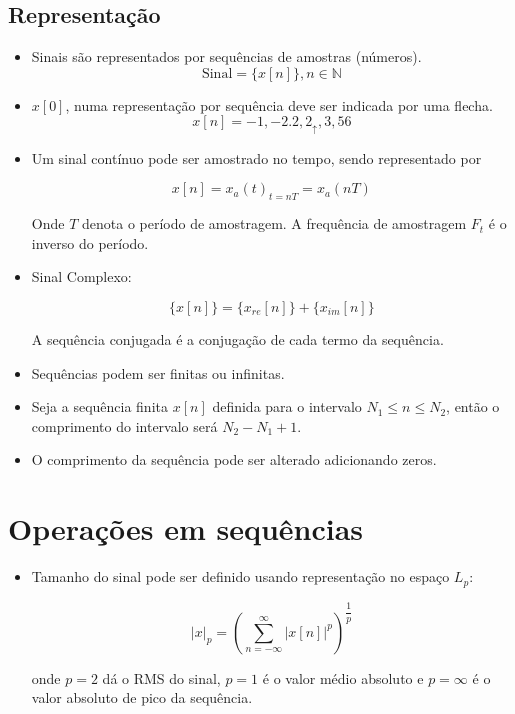 \subsection{Representação}
\begin{itemize}
    \item Sinais são representados por sequências de amostras (números).
    \[\text{Sinal} = \{x[n]\}, n \in \mathbb{N} \]

    \item $x[0]$, numa representação por sequência deve ser indicada por uma flecha.
    \[x[n] = -1, -2.2, 2_{\uparrow}, 3, 56 \]

    \item Um sinal contínuo pode ser amostrado no tempo, sendo representado por
    
    \[x[n] = x_{a}(t)_{t = nT} = x_{a}(nT) \]

    Onde $T$ denota o período de amostragem. A frequência de amostragem $F_{t}$ é o inverso do período.

    \item Sinal Complexo:
    
    \[\{x[n]\} = \{x_{re}[n]\} + \{x_{im}[n]\} \]
    
    A sequência conjugada é a conjugação de cada termo da sequência.

    \item Sequências podem ser finitas ou infinitas. 
    \item Seja a sequência finita $x[n]$ definida para o intervalo $ N_{1} \leq n \leq N_{2} $, então o comprimento do intervalo será $N_{2} - N_{1} + 1$.

    \item O comprimento da sequência pode ser alterado adicionando zeros.
    
\end{itemize}

\section{Operações em sequências}
\begin{itemize}
    \item Tamanho do sinal pode ser definido usando representação no espaço $L_{p}$:
    
    \[|x|_{p} = (\sum_{n = - \infty}^{\infty} |x[n]|^{p})^{\dfrac{1}{p}}\]

    onde $p = 2$ dá o RMS do sinal, $p = 1$ é o valor médio absoluto e $p = \infty$ é o valor absoluto de pico da sequência.

\end{itemize}
